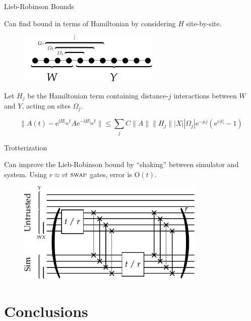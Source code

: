 \documentclass[xcolor=dvipsnames, compress]{beamer}
\newcommand{\ee}{\mathrm{e}}
\newcommand{\ii}{\mathrm{i}}
\newcommand{\OO}{\mathrm{O}}
\newcommand{\swapgt}{\textsc{swap}}
\begin{document}
\begin{frame}{Lieb-Robinson Bounds}

  Can find bound in terms of Hamiltonian by considering $H$ site-by-site.

  \begin{figure}
    \centering
    \includegraphics[width=0.6\textwidth]{bootstrapping-partition-distance}
  \end{figure}

  Let $H_j$ be the Hamiltonian term containing distance-$j$
  interactions between $W$ and $Y$, acting on sites $\Omega_j$.

  $$
    \|A(t) - \ee^{\ii H|_W t} A \ee^{-\ii H|_W t} \| \le
    \sum_{j} C \|A\| \|H_j\| |X| |\Omega_j| \ee^{-\mu j} (\ee^{v |t|} - 1)
  $$

\end{frame}

\begin{frame}{Trotterization}

  Can improve the Lieb-Robinson bound by ``shaking'' between simulator
  and system. Using $r \approx vt$ $\swapgt$ gates, error is $\OO(t)$.

  \begin{figure}
    \centering
    \includegraphics[width=0.8\textwidth]{shaking}
  \end{figure}

\end{frame}

\section{Conclusions}
\end{document}

